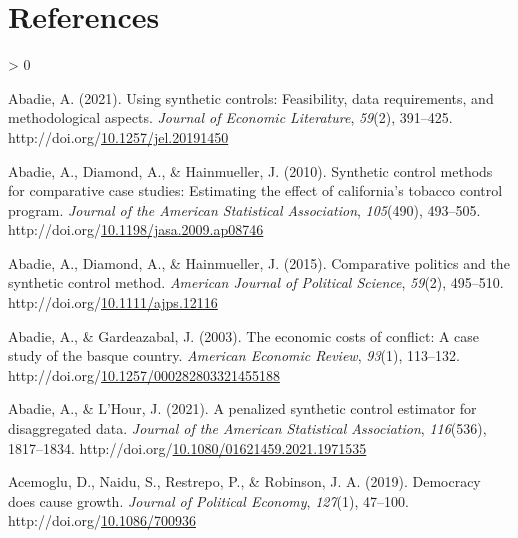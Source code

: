 \documentclass[12pt,nobind, a4paper]{reedthesis}
\newlength{\cslhangindent}
\newenvironment{CSLReferences}[2] %
{%
	\setlength{\parindent}{0pt}
	\ifodd #1 \everypar{\setlength{\hangindent}{\cslhangindent}}\ignorespaces\fi
	\ifnum #2 > 0
	\setlength{\parskip}{#2\baselineskip}
	\fi
}%
{}
\begin{document}
 \backmatter

 \hypertarget{references}{%
 \chapter*{References}\label{references}}


 \noindent

 \setlength{\parindent}{-0.20in}

 \hypertarget{refs}{}
 \begin{CSLReferences}{1}{0}
 \leavevmode\hypertarget{ref-abadie_using_2021}{}%
 Abadie, A. (2021). Using synthetic controls: Feasibility, data requirements, and methodological aspects. \emph{Journal of Economic Literature}, \emph{59}(2), 391--425. http://doi.org/\href{https://doi.org/10.1257/jel.20191450}{10.1257/jel.20191450}

 \leavevmode\hypertarget{ref-abadie_synthetic_2010}{}%
 Abadie, A., Diamond, A., \& Hainmueller, J. (2010). Synthetic control methods for comparative case studies: Estimating the effect of california's tobacco control program. \emph{Journal of the American Statistical Association}, \emph{105}(490), 493--505. http://doi.org/\href{https://doi.org/10.1198/jasa.2009.ap08746}{10.1198/jasa.2009.ap08746}

 \leavevmode\hypertarget{ref-abadie_comparative_2015}{}%
 Abadie, A., Diamond, A., \& Hainmueller, J. (2015). Comparative politics and the synthetic control method. \emph{American Journal of Political Science}, \emph{59}(2), 495--510. http://doi.org/\href{https://doi.org/10.1111/ajps.12116}{10.1111/ajps.12116}

 \leavevmode\hypertarget{ref-abadie_economic_2003}{}%
 Abadie, A., \& Gardeazabal, J. (2003). The economic costs of conflict: A case study of the basque country. \emph{American Economic Review}, \emph{93}(1), 113--132. http://doi.org/\href{https://doi.org/10.1257/000282803321455188}{10.1257/000282803321455188}

 \leavevmode\hypertarget{ref-abadie_penalized_2021}{}%
 Abadie, A., \& L'Hour, J. (2021). A penalized synthetic control estimator for disaggregated data. \emph{Journal of the American Statistical Association}, \emph{116}(536), 1817--1834. http://doi.org/\href{https://doi.org/10.1080/01621459.2021.1971535}{10.1080/01621459.2021.1971535}

 \leavevmode\hypertarget{ref-acemoglu_democracy_2019}{}%
 Acemoglu, D., Naidu, S., Restrepo, P., \& Robinson, J. A. (2019). Democracy does cause growth. \emph{Journal of Political Economy}, \emph{127}(1), 47--100. http://doi.org/\href{https://doi.org/10.1086/700936}{10.1086/700936}


\end{CSLReferences}
\end{document}
